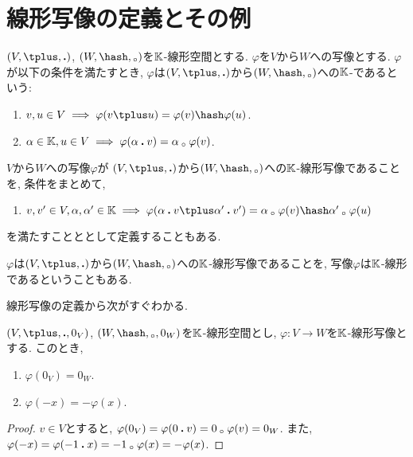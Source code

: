 \section{線形写像の定義とその例}
\label{sec:linmap:def}
\begin{definition}
  $(V,\plus,\act)$, $(W,\pplus,\aact)$を$\mathbb{K}$-線形空間とする.
  $\varphi$を$V$から$W$への写像とする.
  $\varphi$が以下の条件を満たすとき,
  $\varphi$は$(V,\plus,\act)$から$(W,\pplus,\aact)$への$\mathbb{K}$-であるという:
  \begin{enumerate}
    \item $v,u\in V\implies \varphi(v\plus u)=\varphi(v)\pplus\varphi(u)$.
    \item $\alpha\in \mathbb{K}, u\in V\implies \varphi(\alpha\mathbin{\boldsymbol{.}} v)=\alpha\mathbin{{}_\circ}\varphi(v)$.
  \end{enumerate}
\end{definition}

\begin{remark}
  $V$から$W$への写像$\varphi$が
  $(V,\plus,\act)$から$(W,\pplus,\aact)$への$\mathbb{K}$-線形写像であることを,
  条件をまとめて,
  \begin{enumerate}
    \item $v,v'\in V, \alpha,\alpha'\in\KK\implies \varphi(\alpha\act v\plus \alpha'\act v')=\alpha\aact \varphi(v)\pplus \alpha'\aact\varphi(u)$
  \end{enumerate}
  を満たすことととして定義することもある.
\end{remark}

\begin{remark}
  $\varphi$は$(V,\plus,\act)$から$(W,\pplus,\aact)$への$\mathbb{K}$-線形写像であることを,
  写像$\varphi$は$\mathbb{K}$-線形であるということもある.
\end{remark}

線形写像の定義から次がすぐわかる.
\begin{prop}
  $(V,\plus,\act,0_V)$, $(W,\pplus,\aact,0_W)$を$\mathbb{K}$-線形空間とし,
  $\varphi\colon V\to W$を$\mathbb{K}$-線形写像とする.
  このとき,
  \begin{enumerate}
    \item $\varphi(0_V)=0_W$.
    \item $\varphi(-x)=-\varphi(x)$.
  \end{enumerate}
\end{prop}
\begin{proof}
$v\in V$とすると,
$\varphi(0_V)=\varphi(0\mathbin{\boldsymbol{.}} v)=0\mathbin{{}_\circ} \varphi(v)=0_W$.
また,
$\varphi(-x)=\varphi(-1\mathbin{\boldsymbol{.}} x)=-1\mathbin{{}_\circ} \varphi(x)=-\varphi(x)$.
\end{proof}

